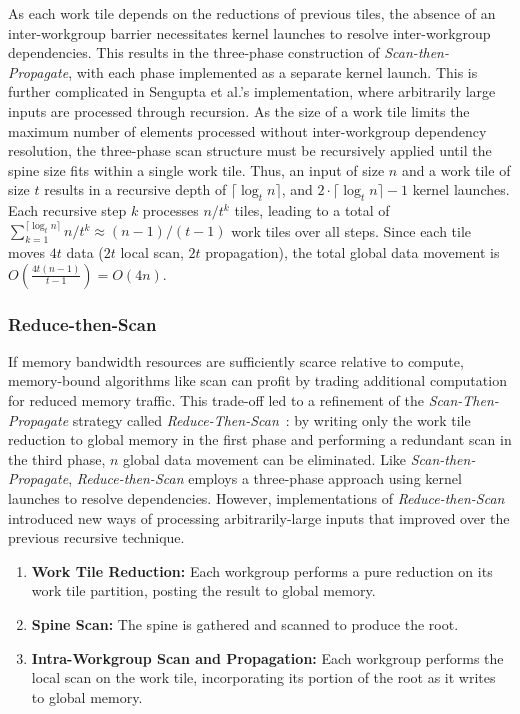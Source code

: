 \documentclass[sigconf]{acmart}
\begin{document}
As each work tile depends on the reductions of previous tiles, the absence of an inter-workgroup barrier necessitates kernel launches to resolve inter-workgroup dependencies. This results in the three-phase construction of \emph{Scan-then-Propagate}, with each phase implemented as a separate kernel launch. This is further complicated in Sengupta et al.'s implementation, where arbitrarily large inputs are processed through recursion. As the size of a work tile limits the maximum number of elements processed without inter-workgroup dependency resolution, the three-phase scan structure must be recursively applied until the spine size fits within a single work tile. Thus, an input of size $n$ and a work tile of size $t$ results in a recursive depth of $\lceil \log_t n \rceil$, and $2\cdot\lceil \log_t n \rceil - 1$ kernel launches. Each recursive step $k$ processes $n/t^k$ tiles, leading to a total of $\sum_{k=1}^{\lceil \log_t n \rceil} n/t^k \approx (n - 1)/(t - 1)$ work tiles over all steps. Since each tile moves $4t$ data ($2t$ local scan, $2t$ propagation), the total global data movement is $O\left(\frac{4t(n - 1)}{t - 1}\right) = O(4n)$.

\subsubsection{Reduce-then-Scan}
If memory bandwidth resources are sufficiently scarce relative to compute, memory-bound algorithms like scan can profit by trading additional computation for reduced memory traffic. This trade-off led to a refinement of the \emph{Scan-Then-Propagate} strategy called \emph{Reduce-Then-Scan}~\cite{Merrill-Grimshaw, Ha-and-Han, Dotsenko, Breitbart}: by writing only the work tile reduction to global memory in the first phase and performing a redundant scan in the third phase, $n$ global data movement can be eliminated. Like \emph{Scan-then-Propagate}, \emph{Reduce-then-Scan} employs a three-phase approach using kernel launches to resolve dependencies. However, implementations of \emph{Reduce-then-Scan} introduced new ways of processing arbitrarily-large inputs that improved over the previous recursive technique.
\begin{enumerate}
  \item \textbf{Work Tile Reduction:} Each workgroup performs a pure reduction on its work tile partition, posting the result to global memory.
  \item \textbf{Spine Scan:} The spine is gathered and scanned to produce the root.
  \item \textbf{Intra-Workgroup Scan and Propagation:} Each workgroup performs the local scan on the work tile, incorporating its portion of the root as it writes to global memory.
\end{enumerate}
\end{document}
